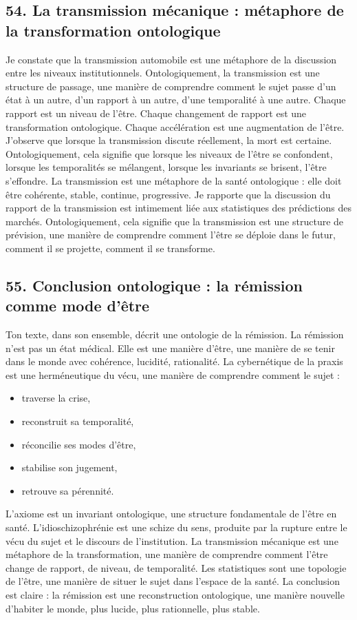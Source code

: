 \documentclass[12pt,letterpaper,oneside]{article}
\begin{document}
\subsection*{54. La transmission mécanique : métaphore de la transformation ontologique}
Je constate que la transmission automobile est une métaphore de la discussion entre les niveaux institutionnels. Ontologiquement, la transmission est une structure de passage, une manière de comprendre comment le sujet passe d’un état à un autre, d’un rapport à un autre, d’une temporalité à une autre.
Chaque rapport est un niveau de l’être. Chaque changement de rapport est une transformation ontologique. Chaque accélération est une augmentation de l’être.
J’observe que lorsque la transmission discute réellement, la mort est certaine. Ontologiquement, cela signifie que lorsque les niveaux de l’être se confondent, lorsque les temporalités se mélangent, lorsque les invariants se brisent, l’être s’effondre.
La transmission est une métaphore de la santé ontologique : elle doit être cohérente, stable, continue, progressive.
Je rapporte que la discussion du rapport de la transmission est intimement liée aux statistiques des prédictions des marchés. Ontologiquement, cela signifie que la transmission est une structure de prévision, une manière de comprendre comment l’être se déploie dans le futur, comment il se projette, comment il se transforme.

\subsection*{55. Conclusion ontologique : la rémission comme mode d’être}
Ton texte, dans son ensemble, décrit une ontologie de la rémission. La rémission n’est pas un état médical. Elle est une manière d’être, une manière de se tenir dans le monde avec cohérence, lucidité, rationalité.
La cybernétique de la praxis est une herméneutique du vécu, une manière de comprendre comment le sujet :
\begin{itemize}
\item traverse la crise,
\item reconstruit sa temporalité,
\item réconcilie ses modes d’être,
\item stabilise son jugement,
\item retrouve sa pérennité.
\end{itemize}
L’axiome est un invariant ontologique, une structure fondamentale de l’être en santé.
L’idioschizophrénie est une schize du sens, produite par la rupture entre le vécu du sujet et le discours de l’institution.
La transmission mécanique est une métaphore de la transformation, une manière de comprendre comment l’être change de rapport, de niveau, de temporalité.
Les statistiques sont une topologie de l’être, une manière de situer le sujet dans l’espace de la santé.
La conclusion est claire : la rémission est une reconstruction ontologique, une manière nouvelle d’habiter le monde, plus lucide, plus rationnelle, plus stable.
\end{document}
